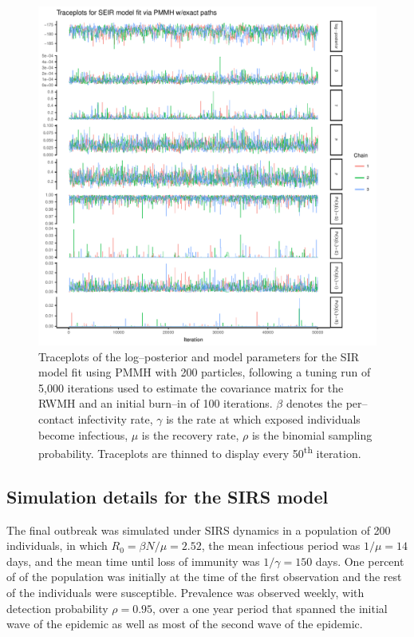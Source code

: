 \begin{figure}[htbp]
	\centering
	\includegraphics[width=0.9\linewidth]{figures/seir_pomp_exact_traceplots}
	\caption[Simulation 1 MCMC traceplots for an SIR model fit using PMMH with exact particle paths.]{Traceplots of the log--posterior and model parameters for the SIR model fit using PMMH with 200 particles, following a tuning run of 5,000 iterations used to estimate the covariance matrix for the RWMH and an initial burn--in of 100 iterations. $ \beta $ denotes the per--contact infectivity rate, $ \gamma $ is the rate at which exposed individuals become infectious, $ \mu $ is the recovery rate, $ \rho $ is the binomial sampling probability. Traceplots are thinned to display every 50\textsuperscript{th} iteration.}
	\label{fig:seirpompexacttraceplots}
\end{figure}

\newpage
\subsection{Simulation details for the SIRS model}
The final outbreak was simulated under SIRS dynamics in a population of 200 individuals, in which $ R_0 = \beta N / \mu = 2.52 $, the mean infectious period was $ 1/\mu = 14 $ days, and the mean time until loss of immunity was $ 1/\gamma = 150 $ days. One percent of of the population was initially at the time of the first observation and the rest of the individuals were susceptible. Prevalence was observed weekly, with detection probability $ \rho = 0.95 $, over a one year period that spanned the initial wave of the epidemic as well as most of the second wave of the epidemic. 

